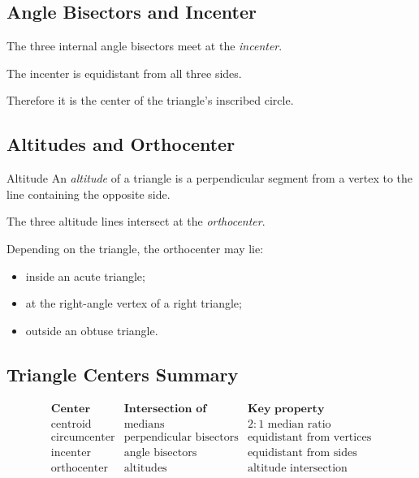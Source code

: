 \subsection{Angle Bisectors and Incenter}
\label{subsec:incenter}

The three internal angle bisectors meet at the \emph{incenter}.

The incenter is equidistant from all three sides.

Therefore it is the center of the triangle's inscribed circle.

\subsection{Altitudes and Orthocenter}
\label{subsec:orthocenter}

\begin{definitionbox}{Altitude}
An \emph{altitude} of a triangle is a perpendicular segment from a vertex
to the line containing the opposite side.
\end{definitionbox}

The three altitude lines intersect at the \emph{orthocenter}.

Depending on the triangle, the orthocenter may lie:

\begin{itemize}
    \item inside an acute triangle;
    \item at the right-angle vertex of a right triangle;
    \item outside an obtuse triangle.
\end{itemize}

\subsection{Triangle Centers Summary}
\label{subsec:triangle-centers-summary}

\[
\begin{array}{c|c|c}
\textbf{Center} & \textbf{Intersection of} & \textbf{Key property}\\
\hline
\text{centroid} & \text{medians} & 2:1\text{ median ratio}\\
\text{circumcenter} & \text{perpendicular bisectors} & \text{equidistant from vertices}\\
\text{incenter} & \text{angle bisectors} & \text{equidistant from sides}\\
\text{orthocenter} & \text{altitudes} & \text{altitude intersection}
\end{array}
\]

